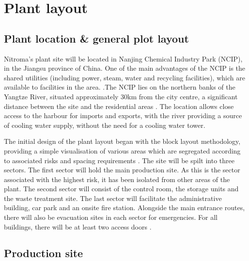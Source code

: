 \section{Plant layout}

\subsection{Plant location \& general plot layout}

Nitroma’s plant site will be located in Nanjing Chemical Industry Park (NCIP), in the Jiangsu province of China. One of the main advantages of the NCIP is the shared utilities (including power, steam, water and recycling facilities), which are available to facilities in the area. \cite{independent_commodity_intelligence_services_china_2007}.The NCIP lies on the northern banks of the Yangtze River, situated approximately 30km from the city centre, a significant distance between the site and the residential areas \cite{zeng_divergent_2011}. The location allows close access to the harbour for imports and exports, with the river providing a source of cooling water supply, without the need for a cooling water tower.    


The initial design of the plant layout began with the block layout methodology, providing a simple visualisation of various areas which are segregated according to associated risks and spacing requirements \cite{center_for_chemical_process_safety_site_2010}. The site will be spilt into three sectors. The first sector will hold the main production site. As this is the sector associated with the highest risk, it has been isolated from other areas of the plant. The second sector will consist of the control room, the storage units and the waste treatment site. The last sector will facilitate the administrative building, car park and an onsite fire station. Alongside the main entrance routes, there will also be evacuation sites in each sector for emergencies. For all buildings, there will be at least two access doors \cite{aiche_dows_1994}.






\subsection{Production site}

